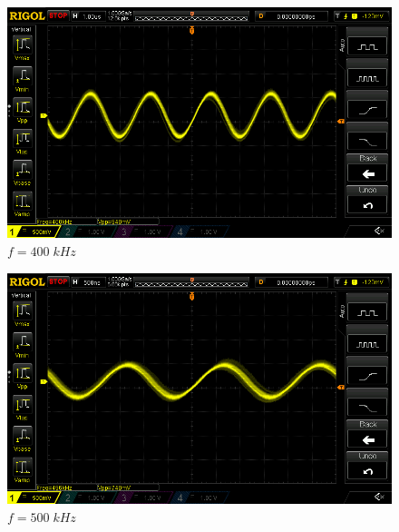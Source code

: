 \documentclass[uplatex,a4paper,11pt,oneside,openany]{jsbook}
\begin{document}
\begin{spacing}{0.67}
  \begin{multicols}{2}
    \begin{figure}[H]
       \centering
        \includegraphics[keepaspectratio, scale=0.28, angle=0]
                    {rigol/figs/FrqCharM1Y1_2kR/400khz.png}
                    \caption{$f=400\;kHz$}
                    \label{fig:frq400k}
    \end{figure}
  
    \begin{figure}[H]
       \centering
        \includegraphics[keepaspectratio, scale=0.28, angle=0]
                  {rigol/figs/FrqCharM1Y1_2kR/500khz.png}
                  \caption{$f=500\;kHz$}
                  \label{fig:frq500k}
    \end{figure}
  \end{multicols}


\end{spacing}
\end{document}
